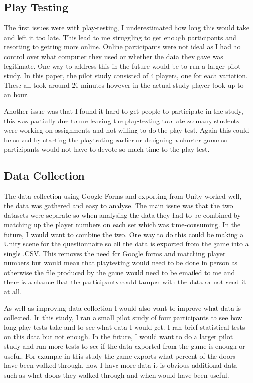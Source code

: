 \documentclass[journal]{IEEEtran}
\begin{document}
	\subsection{Play Testing}
	The first issues were with play-testing, I underestimated how long this would take and left it too late. This lead to me struggling to get enough participants and resorting to getting more online. Online participants were not ideal as I had no control over what computer they used or whether the data they gave was legitimate. One way to address this in the future would be to run a larger pilot study. In this paper, the pilot study consisted of 4 players, one for each variation. These all took around 20 minutes however in the actual study player took up to an hour.     
	
	Another issue was that I found it hard to get people to participate in the study, this was partially due to me leaving the play-testing too late so many students were working on assignments and not willing to do the play-test. Again this could be solved by starting the playtesting earlier or designing a shorter game so participants would not have to devote so much time to the play-test.
	
	\subsection{Data Collection}
	The data collection using Google Forms and exporting from Unity worked well, the data was gathered and easy to analyse. The main issue was that the two datasets were separate so when analysing the data they had to be combined by matching up the player numbers on each set which was time-consuming. In the future, I would want to combine the two. One way to do this could be making a Unity scene for the questionnaire so all the data is exported from the game into a single .CSV. This removes the need for Google forms and matching player numbers but would mean that playtesting would need to be done in person as otherwise the file produced by the game would need to be emailed to me and there is a chance that the participants could tamper with the data or not send it at all.
	
	As well as improving data collection I would also want to improve what data is collected. In this study, I ran a small pilot study of four participants to see how long play tests take and to see what data I would get. I ran brief statistical tests on this data but not enough. In the future, I would want to do a larger pilot study and run more tests to see if the data exported from the game is enough or useful. For example in this study the game exports what percent of the doors have been walked through, now I have more data it is obvious additional data such as what doors they walked through and when would have been useful.
	
\end{document}
